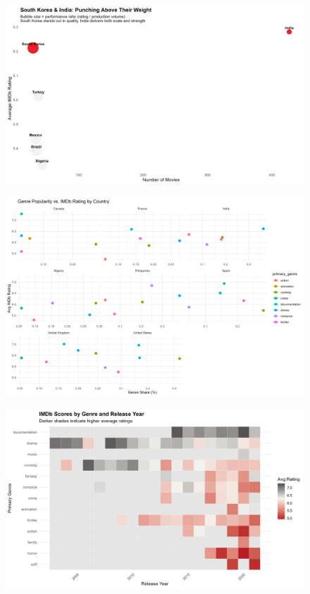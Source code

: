\documentclass[
  man,floatsintext]{apa6}
\begin{document}
\begin{figure}

{\centering \includegraphics[width=0.9\linewidth]{../Question3/Results/emergers} 

}

\caption{ }\label{fig:audienceengage-3}
\end{figure}
\begin{figure}

{\centering \includegraphics[width=0.9\linewidth]{../Question3/Results/genre_rating_plot} 

}

\caption{ }\label{fig:audienceengage-4}
\end{figure}
\begin{figure}

{\centering \includegraphics[width=0.9\linewidth]{../Question3/Results/genrescore} 

}

\caption{ }\label{fig:audienceengage-5}
\end{figure}
\end{document}
